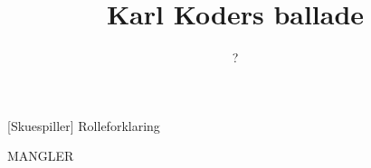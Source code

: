 \documentclass[a4paper,11pt]{article}
\title{Karl Koders ballade}
\author{?}
\begin{document}
\maketitle

\begin{roles}
[Skuespiller] Rolleforklaring
\end{roles}

\begin{song}
MANGLER
\end{song}
\end{document}
